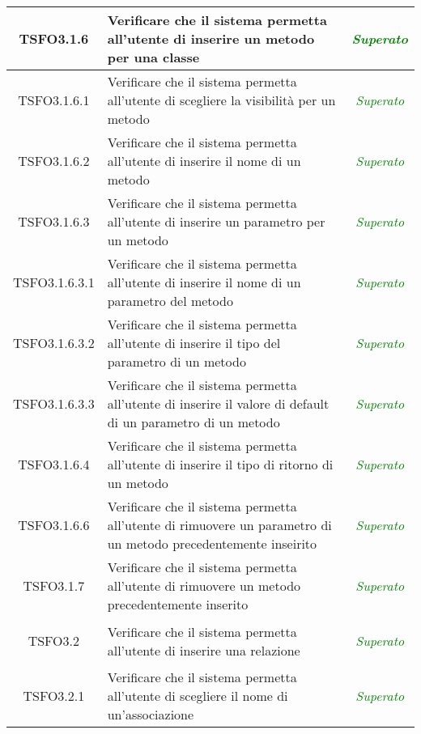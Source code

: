 \begin{longtable}{|c|>{}m{8cm}|c|}
\hypertarget{TSFO3.1.6}{TSFO3.1.6} & Verificare che il sistema permetta all'utente di inserire un metodo per una classe & \textcolor{Green}{\textit{Superato}}\\ \hline
\hypertarget{TSFO3.1.6.1}{TSFO3.1.6.1} & Verificare che il sistema permetta all'utente di scegliere la visibilità per un metodo & \textcolor{Green}{\textit{Superato}}\\ \hline
\hypertarget{TSFO3.1.6.2}{TSFO3.1.6.2} & Verificare che il sistema permetta all'utente di inserire il nome di un metodo & \textcolor{Green}{\textit{Superato}}\\ \hline
\hypertarget{TSFO3.1.6.3}{TSFO3.1.6.3} & Verificare che il sistema permetta all'utente di inserire un parametro per un metodo & \textcolor{Green}{\textit{Superato}}\\ \hline
\hypertarget{TSFO3.1.6.3.1}{TSFO3.1.6.3.1} & Verificare che il sistema permetta all'utente di inserire il nome di un parametro del metodo & \textcolor{Green}{\textit{Superato}}\\ \hline
\hypertarget{TSFO3.1.6.3.2}{TSFO3.1.6.3.2} & Verificare che il sistema permetta all'utente di inserire il tipo del parametro di un metodo & \textcolor{Green}{\textit{Superato}}\\ \hline
\hypertarget{TSFO3.1.6.3.3}{TSFO3.1.6.3.3} & Verificare che il sistema permetta all'utente di inserire il valore di default di un parametro di un metodo & \textcolor{Green}{\textit{Superato}}\\ \hline
\hypertarget{TSFO3.1.6.4}{TSFO3.1.6.4} & Verificare che il sistema permetta all'utente di inserire il tipo di ritorno di un metodo & \textcolor{Green}{\textit{Superato}}\\ \hline
\hypertarget{TSFO3.1.6.6}{TSFO3.1.6.6} & Verificare che il sistema permetta all'utente di rimuovere un parametro di un metodo precedentemente inseirito & \textcolor{Green}{\textit{Superato}}\\ \hline
\hypertarget{TSFO3.1.7}{TSFO3.1.7} & Verificare che il sistema permetta all'utente di rimuovere un metodo precedentemente inserito & \textcolor{Green}{\textit{Superato}}\\ \hline
\hypertarget{TSFO3.2}{TSFO3.2} & Verificare che il sistema permetta all'utente di inserire una relazione & \textcolor{Green}{\textit{Superato}}\\ \hline
\hypertarget{TSFO3.2.1}{TSFO3.2.1} & Verificare che il sistema permetta all'utente di scegliere il nome di un'associazione & \textcolor{Green}{\textit{Superato}}\\ \hline

\end{longtable}
